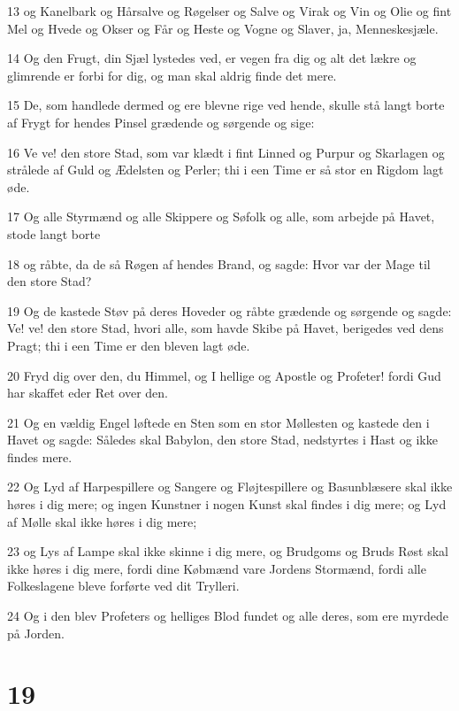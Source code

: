 \par 13 og Kanelbark og Hårsalve og Røgelser og Salve og Virak og Vin og Olie og fint Mel og Hvede og Okser og Får og Heste og Vogne og Slaver, ja, Menneskesjæle.
\par 14 Og den Frugt, din Sjæl lystedes ved, er vegen fra dig og alt det lækre og glimrende er forbi for dig, og man skal aldrig finde det mere.
\par 15 De, som handlede dermed og ere blevne rige ved hende, skulle stå langt borte af Frygt for hendes Pinsel grædende og sørgende og sige:
\par 16 Ve ve! den store Stad, som var klædt i fint Linned og Purpur og Skarlagen og strålede af Guld og Ædelsten og Perler; thi i een Time er så stor en Rigdom lagt øde.
\par 17 Og alle Styrmænd og alle Skippere og Søfolk og alle, som arbejde på Havet, stode langt borte
\par 18 og råbte, da de så Røgen af hendes Brand, og sagde: Hvor var der Mage til den store Stad?
\par 19 Og de kastede Støv på deres Hoveder og råbte grædende og sørgende og sagde: Ve! ve! den store Stad, hvori alle, som havde Skibe på Havet, berigedes ved dens Pragt; thi i een Time er den bleven lagt øde.
\par 20 Fryd dig over den, du Himmel, og I hellige og Apostle og Profeter! fordi Gud har skaffet eder Ret over den.
\par 21 Og en vældig Engel løftede en Sten som en stor Møllesten og kastede den i Havet og sagde: Således skal Babylon, den store Stad, nedstyrtes i Hast og ikke findes mere.
\par 22 Og Lyd af Harpespillere og Sangere og Fløjtespillere og Basunblæsere skal ikke høres i dig mere; og ingen Kunstner i nogen Kunst skal findes i dig mere; og Lyd af Mølle skal ikke høres i dig mere;
\par 23 og Lys af Lampe skal ikke skinne i dig mere, og Brudgoms og Bruds Røst skal ikke høres i dig mere, fordi dine Købmænd vare Jordens Stormænd, fordi alle Folkeslagene bleve forførte ved dit Trylleri.
\par 24 Og i den blev Profeters og helliges Blod fundet og alle deres, som ere myrdede på Jorden.

\chapter{19}

